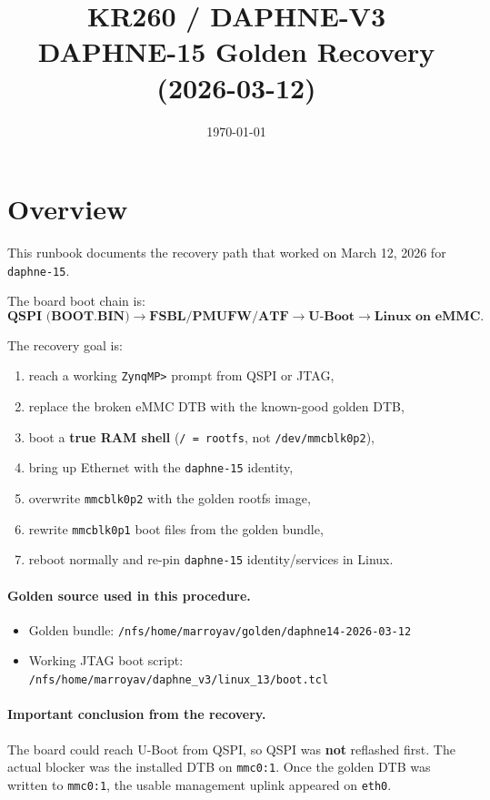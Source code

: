 \documentclass[a4paper,11pt]{article}
\title{KR260 / DAPHNE-V3\\[4pt]\large DAPHNE-15 Golden Recovery (2026-03-12)}
\author{}
\date{\today}
\begin{document}
\maketitle
\tableofcontents
\clearpage

\section{Overview}

This runbook documents the recovery path that worked on March 12, 2026 for
\texttt{daphne-15}.

The board boot chain is:
\[
\textbf{QSPI (BOOT.BIN)} \rightarrow \textbf{FSBL/PMUFW/ATF} \rightarrow \textbf{U-Boot} \rightarrow \textbf{Linux on eMMC}.
\]

The recovery goal is:
\begin{enumerate}[label=\arabic*.]
  \item reach a working \texttt{ZynqMP>} prompt from QSPI or JTAG,
  \item replace the broken eMMC DTB with the known-good golden DTB,
  \item boot a \textbf{true RAM shell} (\texttt{/ = rootfs}, not \texttt{/dev/mmcblk0p2}),
  \item bring up Ethernet with the \texttt{daphne-15} identity,
  \item overwrite \texttt{mmcblk0p2} with the golden rootfs image,
  \item rewrite \texttt{mmcblk0p1} boot files from the golden bundle,
  \item reboot normally and re-pin \texttt{daphne-15} identity/services in Linux.
\end{enumerate}

\paragraph{Golden source used in this procedure.}
\begin{itemize}
  \item Golden bundle: \texttt{/nfs/home/marroyav/golden/daphne14-2026-03-12}
  \item Working JTAG boot script: \texttt{/nfs/home/marroyav/daphne_v3/linux_13/boot.tcl}
\end{itemize}

\paragraph{Important conclusion from the recovery.}
The board could reach U-Boot from QSPI, so QSPI was \textbf{not} reflashed first.
The actual blocker was the installed DTB on \texttt{mmc0:1}. Once the golden DTB
was written to \texttt{mmc0:1}, the usable management uplink appeared on
\texttt{eth0}.
\end{document}

